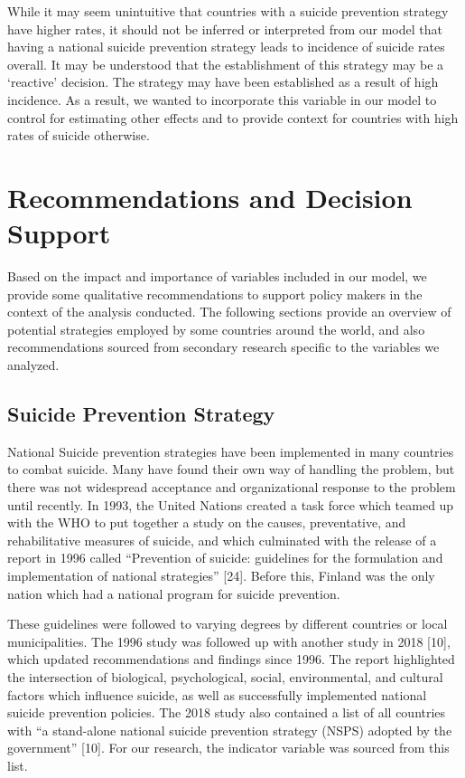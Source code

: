 \documentclass[]{article}
\begin{document}
While it may seem unintuitive that countries with a suicide prevention
strategy have higher rates, it should not be inferred or interpreted
from our model that having a national suicide prevention strategy leads
to incidence of suicide rates overall. It may be understood that the
establishment of this strategy may be a `reactive' decision. The
strategy may have been established as a result of high incidence. As a
result, we wanted to incorporate this variable in our model to control
for estimating other effects and to provide context for countries with
high rates of suicide otherwise.

\section{Recommendations and Decision
Support}\label{recommendations-and-decision-support}

Based on the impact and importance of variables included in our model,
we provide some qualitative recommendations to support policy makers in
the context of the analysis conducted. The following sections provide an
overview of potential strategies employed by some countries around the
world, and also recommendations sourced from secondary research specific
to the variables we analyzed.

\subsection{Suicide Prevention
Strategy}\label{suicide-prevention-strategy}

National Suicide prevention strategies have been implemented in many
countries to combat suicide. Many have found their own way of handling
the problem, but there was not widespread acceptance and organizational
response to the problem until recently. In 1993, the United Nations
created a task force which teamed up with the WHO to put together a
study on the causes, preventative, and rehabilitative measures of
suicide, and which culminated with the release of a report in 1996
called ``Prevention of suicide: guidelines for the formulation and
implementation of national strategies'' {[}24{]}. Before this, Finland
was the only nation which had a national program for suicide prevention.

These guidelines were followed to varying degrees by different countries
or local municipalities. The 1996 study was followed up with another
study in 2018 {[}10{]}, which updated recommendations and findings since
1996. The report highlighted the intersection of biological,
psychological, social, environmental, and cultural factors which
influence suicide, as well as successfully implemented national suicide
prevention policies. The 2018 study also contained a list of all
countries with ``a stand-alone national suicide prevention strategy
(NSPS) adopted by the government'' {[}10{]}. For our research, the
indicator variable was sourced from this list.
\end{document}

